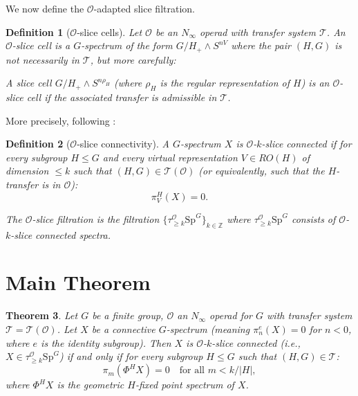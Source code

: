 \documentclass[12pt]{article}
\newtheorem{theorem}{Theorem}
\newtheorem{definition}[theorem]{Definition}
\begin{document}
We now define the $\mathcal{O}$-adapted slice filtration.

\begin{definition}[$\mathcal{O}$-slice cells]
Let $\mathcal{O}$ be an $N_\infty$ operad with transfer system $\mathcal{T}$. An \emph{$\mathcal{O}$-slice cell} is a $G$-spectrum of the form $G/H_+ \wedge S^{nV}$ where the pair $(H, G)$ is \emph{not} necessarily in $\mathcal{T}$, but more carefully:

A slice cell $G/H_+ \wedge S^{n\rho_H}$ (where $\rho_H$ is the regular representation of $H$) is an $\mathcal{O}$-slice cell if the associated transfer is admissible in $\mathcal{T}$.
\end{definition}

More precisely, following \cite{Ullman2013,Yarnall2019}:

\begin{definition}[$\mathcal{O}$-slice connectivity]\label{def:O-connectivity}
A $G$-spectrum $X$ is \emph{$\mathcal{O}$-$k$-slice connected} if for every subgroup $H \leq G$ and every virtual representation $V \in RO(H)$ of dimension $\leq k$ such that $(H, G) \in \mathcal{T}(\mathcal{O})$ (or equivalently, such that the $H$-transfer is in $\mathcal{O}$):
\[
\pi_V^H(X) = 0.
\]

The \emph{$\mathcal{O}$-slice filtration} is the filtration $\{\tau_{\geq k}^{\mathcal{O}} \mathrm{Sp}^G\}_{k \in \mathbb{Z}}$ where $\tau_{\geq k}^{\mathcal{O}} \mathrm{Sp}^G$ consists of $\mathcal{O}$-$k$-slice connected spectra.
\end{definition}

\section{Main Theorem}

\begin{theorem}\label{thm:main}
Let $G$ be a finite group, $\mathcal{O}$ an $N_\infty$ operad for $G$ with transfer system $\mathcal{T} = \mathcal{T}(\mathcal{O})$. Let $X$ be a connective $G$-spectrum (meaning $\pi_n^e(X) = 0$ for $n < 0$, where $e$ is the identity subgroup). Then $X$ is $\mathcal{O}$-$k$-slice connected (i.e., $X \in \tau_{\geq k}^{\mathcal{O}} \mathrm{Sp}^G$) if and only if for every subgroup $H \leq G$ such that $(H, G) \in \mathcal{T}$:
\[
\pi_m(\Phi^H X) = 0 \quad \text{for all } m < k/|H|,
\]
where $\Phi^H X$ is the geometric $H$-fixed point spectrum of $X$.
\end{theorem}
\end{document}
